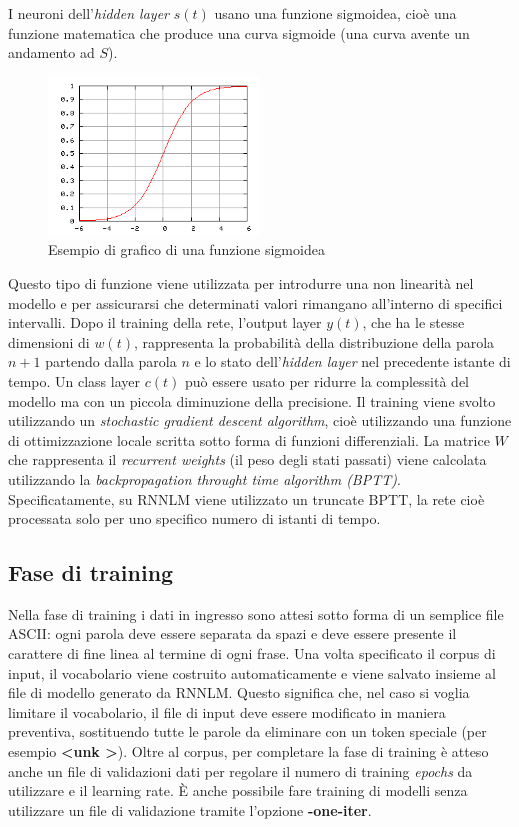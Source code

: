 \documentclass[a4paper,12pt,openright,twoside]{report}
\theoremstyle{definition}
\begin{document}
I neuroni dell'\emph{hidden layer} $s(t)$ usano una funzione sigmoidea, cioè una funzione matematica
che produce una curva sigmoide (una curva avente un andamento ad $S$).

\begin{figure}[ht]
  \centering
      \includegraphics[width=0.5\textwidth]{Immagini/sigmoide.png}
      \caption{Esempio di grafico di una funzione sigmoidea}
\label{fig:sigmoide}
\end{figure}

Questo tipo di funzione viene utilizzata per introdurre una non linearità nel modello e per
assicurarsi che determinati  valori rimangano all'interno di specifici intervalli.
Dopo il training della rete, l'output layer $y(t)$, che ha le stesse dimensioni di $w(t)$,
rappresenta la probabilità della distribuzione della parola $n+1$ partendo dalla parola $n$ 
e lo stato dell'\emph{hidden layer} nel precedente istante di tempo.
Un class layer $c(t)$ può essere usato per ridurre la complessità del modello ma con un piccola
diminuzione della precisione.
Il training viene svolto utilizzando un \emph{stochastic gradient descent algorithm}, cioè utilizzando
una funzione di ottimizzazione locale scritta sotto forma di funzioni differenziali. La matrice $W$
che rappresenta il \emph{recurrent weights} (il peso degli stati passati) viene calcolata utilizzando la 
\emph{backpropagation throught time algorithm (BPTT)}.
Specificatamente, su RNNLM viene utilizzato un truncate BPTT, la rete cioè processata solo per uno specifico
numero di istanti di tempo.

\subsection{Fase di training}
Nella fase di training i dati in ingresso sono attesi sotto forma di un semplice file ASCII: ogni parola
deve essere separata da spazi e deve essere presente il carattere di
fine linea al termine di ogni frase.
Una volta specificato il corpus di input, il vocabolario viene costruito automaticamente e viene salvato insieme 
al file di modello generato da RNNLM.
Questo significa che, nel caso si voglia limitare il vocabolario, il file di input deve essere modificato in maniera
preventiva, sostituendo
tutte le parole da eliminare con un token speciale (per esempio \textbf{\textless unk \textgreater}).
Oltre al corpus, per completare la fase di training è atteso anche un
file di validazioni dati per regolare il numero di training \emph{epochs} da utilizzare e  il learning rate.
\`E anche possibile fare training di modelli senza utilizzare un file di validazione tramite l'opzione \textbf{-one-iter}.
\end{document}
